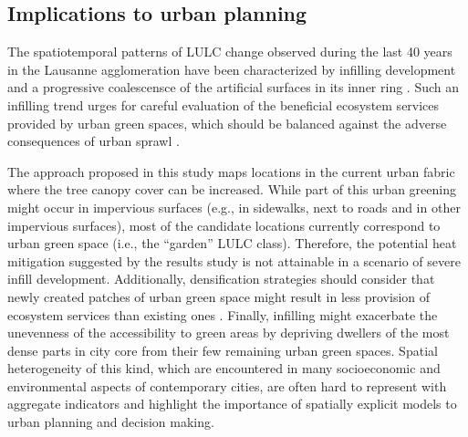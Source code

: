 \documentclass[10pt,letterpaper]{article}
\begin{document}



\subsection*{Implications to urban planning}

The spatiotemporal patterns of LULC change observed during the last 40 years in the Lausanne agglomeration have been characterized by infilling development and a progressive coalescensce of the artificial surfaces in its inner ring \cite{bosch2020spatiotemporal}.
Such an infilling trend urges for careful evaluation of the beneficial ecosystem services provided by urban green spaces, which should be balanced against the adverse consequences of urban sprawl \cite{haaland2015challenges,artmann2019urban}.

The approach proposed in this study maps locations in the current urban fabric where the tree canopy cover can be increased.
While part of this urban greening might occur in impervious surfaces (e.g., in sidewalks, next to roads and in other impervious surfaces), most of the candidate locations currently correspond to urban green space (i.e., the ``garden'' LULC class).
Therefore, the potential heat mitigation suggested by the results study is not attainable in a scenario of severe infill development.
Additionally, densification strategies should consider that newly created patches of urban green space might result in less provision of ecosystem services than existing ones \cite{sun2017effects,wang2019quantity}.
Finally, infilling might exacerbate the unevenness of the accessibility to green areas by depriving dwellers of the most dense parts in city core from their few remaining urban green spaces.  %
Spatial heterogeneity of this kind, which are encountered in many socioeconomic and environmental aspects of contemporary cities, are often hard to represent with aggregate indicators and highlight the importance of spatially explicit models to urban planning and decision making.
\end{document}
